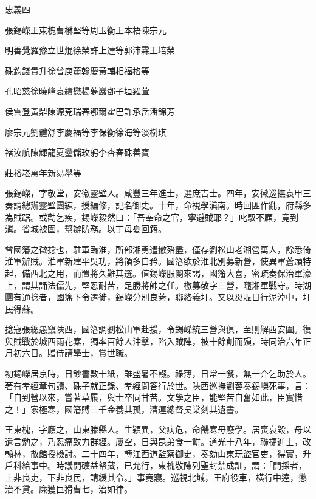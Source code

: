
\begin{pinyinscope}
忠義四

張錫嶸王東槐曹楙堅等周玉衡王本梧陳宗元

明善覺羅豫立世焜徐榮許上達等郭沛霖王培榮

硃鈞錢貴升徐曾庾蕭翰慶黃輔相福格等

孔昭慈徐曉峰袁績懋楊夢巖鄧子垣羅萱

侯雲登黃鼎陳源兗瑞春鄂爾霍巴許承岳潘錦芳

廖宗元劉體舒李慶福等李保衡徐海等淡樹琪

褚汝航陳輝龍夏鑾儲玫躬李杏春硃善寶

莊裕崧萬年新易舉等

張錫嶸，字敬堂，安徽靈壁人。咸豐三年進士，選庶吉士。四年，安徽巡撫袁甲三奏請總辦靈壁團練，授編修，記名御史。十年，命視學滇南。時回匪作亂，府縣多為賊踞。或勸乞疾，錫嶸毅然曰：「吾奉命之官，寧避賊耶？」叱馭不顧，竟到滇。省城被圍，幫辦防務。以丁母憂回籍。

曾國籓之徵捻也，駐軍臨淮，所部湘勇遣撤殆盡，僅存劉松山老湘營萬人，餘悉倚淮軍辦賊。淮軍新建平吳功，將領多自矜。國籓欲於淮北別募新營，使異軍蒼頭特起，備西北之用，而置將久難其選。值錫嶸服闋來謁，國籓大喜，密疏奏保治軍濠上，謂其誦法儒先，堅忍耐苦，足勝將帥之任。檄募敬字三營，隨湘軍戰守。時湖團有通捻者，國籓下令遷徙，錫嶸分別良莠，聯絡義圩。又以災賑日行泥淖中，圩民得蘇。

捻寇張總愚竄陜西，國籓調劉松山軍赴援，令錫嶸統三營與俱，至則解西安圍。復與賊戰於城西雨花寨，獨率百餘人沖擊，陷入賊陣，被十餘創而殞，時同治六年正月初六日。贈侍講學士，賞世職。

初錫嶸居京時，日鈔書數十紙，雖盛暑不輟。祿薄，日常一餐，無一介乞助於人。著有孝經章句讀、硃子就正錄、孝經問答行於世。陜西巡撫劉蓉奏錫嶸死事，言：「自到營以來，嘗著草履，與士卒同甘苦。文學之臣，能堅苦自奮如此，臣實惜之！」家極寒，國籓賻三千金養其孤，漕運總督吳棠刻其遺書。

王東槐，字廕之，山東滕縣人。生穎異，父病危，命饑寒毋廢學。居喪哀毀，母以遺言勉之，乃忍痛致力群經。屢空，日與昆弟食一餅。道光十八年，聯捷進士，改翰林，散館授檢討。二十四年，轉江西道監察御史，奏劾山東玩盜官吏，得實，升戶科給事中。時議開礦益帑藏，已允行，東槐敬陳列聖封禁成訓，謂：「開採者，上非良吏，下非良民，請緩其令。」事竟寢。巡視北城，王府役車，橫行中逵，懲治不貸。廉獲巨猾曹七，治如律。


\end{pinyinscope}
